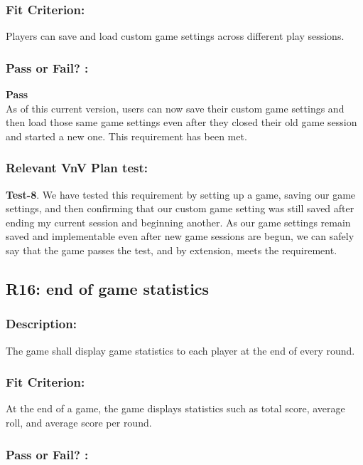 \documentclass[12pt, titlepage]{article}
\begin{document}
\subsubsection*{Fit Criterion:}Players can save and load custom game settings across different play sessions.


\subsubsection*{Pass or Fail? :} 

 \noindent \textbf{Pass}\\
 
 \noindent As of this current version, users can now save their custom game settings and then load those same game settings even after they closed their old game session and started a new one. This requirement has been met.

\subsubsection*{Relevant VnV Plan test: } \textbf{Test-8}. We have tested this requirement by setting up a game, saving our game settings, and then confirming that our custom game setting was still saved after ending my current session and beginning another. As our game settings remain saved and implementable even after new game sessions are begun, we can safely say that the game passes the test, and by extension, meets the requirement.


\subsection{R16: end of game statistics} 
\label{R16} 

\subsubsection*{Description:}The game shall display game statistics to each player at the end of every round.

\subsubsection*{Fit Criterion:}At the end of a game, the game displays statistics such as total score, average roll, and average score per round.

\subsubsection*{Pass or Fail? :} 
\end{document}
